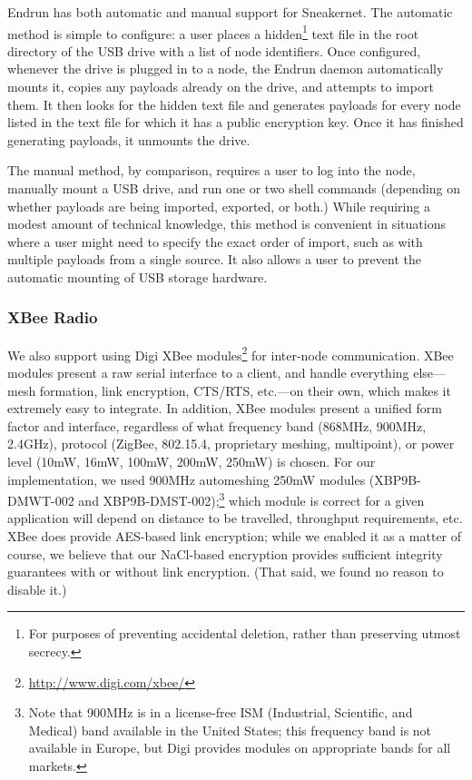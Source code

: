 \documentclass[12pt]{article}
\begin{document}
  Endrun has both automatic and manual support for Sneakernet. The automatic method is simple to configure: a user places a hidden\footnote{For purposes of preventing accidental deletion, rather than preserving utmost secrecy.} text file in the root directory of the USB drive with a list of node identifiers. Once configured, whenever the drive is plugged in to a node, the Endrun daemon automatically mounts it, copies any payloads already on the drive, and attempts to import them. It then looks for the hidden text file and generates payloads for every node listed in the text file for which it has a public encryption key. Once it has finished generating payloads, it unmounts the drive. 
    
  The manual method, by comparison, requires a user to log into the node, manually mount a USB drive, and run one or two shell commands (depending on whether payloads are being imported, exported, or both.) While requiring a modest amount of technical knowledge, this method is convenient in situations where a user might need to specify the exact order of import, such as with multiple payloads from a single source. It also allows a user to prevent the automatic mounting of USB storage hardware.
  
  \subsubsection{XBee Radio}
  
  We also support using Digi XBee modules\footnote{\url{http://www.digi.com/xbee/}} for inter-node communication. XBee modules present a raw serial interface to a client, and handle everything else---mesh formation, link encryption, CTS/RTS, etc.---on their own, which makes it extremely easy to integrate. In addition, XBee modules present a unified form factor and interface, regardless of what frequency band (868MHz, 900MHz, 2.4GHz), protocol (ZigBee, 802.15.4, proprietary meshing, multipoint), or power level (10mW, 16mW, 100mW, 200mW, 250mW) is chosen. For our implementation, we used 900MHz automeshing 250mW modules (XBP9B-DMWT-002 and XBP9B-DMST-002);\footnote{Note that 900MHz is in a license-free ISM (Industrial, Scientific, and Medical) band available in the United States; this frequency band is not available in Europe, but Digi provides modules on appropriate bands for all markets.} which module is correct for a given application will depend on distance to be travelled, throughput requirements, etc. XBee does provide AES-based link encryption; while we enabled it as a matter of course, we believe that our NaCl-based encryption provides sufficient integrity guarantees with or without link encryption. (That said, we found no reason to disable it.)
  
\end{document}
